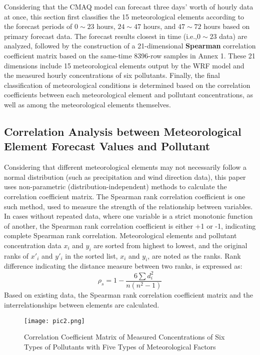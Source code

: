 \documentclass[12pt]{article}
\begin{document}
Considering that the CMAQ model can forecast three days' worth of hourly data at once, this section first classifies the 15 meteorological elements according to the forecast periods of $0\sim23$ hours, $24\sim47$ hours, and $47\sim72$ hours based on primary forecast data. The forecast results closest in time (i.e.,$0\sim23$ data) are analyzed, followed by the construction of a 21-dimensional \textbf{Spearman} correlation coefficient matrix based on the same-time 8396-row samples in Annex 1. These 21 dimensions include 15 meteorological elements output by the WRF model and the measured hourly concentrations of six pollutants. Finally, the final classification of meteorological conditions is determined based on the correlation coefficients between each meteorological element and pollutant concentrations, as well as among the meteorological elements themselves.

\subsection{Correlation Analysis between Meteorological Element Forecast Values and Pollutant }
Considering that different meteorological elements may not necessarily follow a normal distribution (such as precipitation and wind direction data), this paper uses non-parametric (distribution-independent) methods to calculate the correlation coefficient matrix. The Spearman rank correlation coefficient is one such method, used to measure the strength of the relationship between variables. In cases without repeated data, where one variable is a strict monotonic function of another, the Spearman rank correlation coefficient is either +1 or -1, indicating complete Spearman rank correlation.
Meteorological elements and pollutant concentration data $x_i$ and $y_i$ are sorted from highest to lowest, and the original ranks of $x'_i$ and $y'_i$ in the sorted list, $x_i$ and $y_i$, are noted as the ranks. Rank difference indicating the distance measure between two ranks, is expressed as:
\begin{equation}
	\rho_s=1-\frac{6 \sum d_i^2}{n\left(n^2-1\right)}
\end{equation}
Based on existing data, the Spearman rank correlation coefficient matrix and the interrelationships between elements are calculated.
\begin{figure}[H]
	\caption{Correlation Coefficient Matrix of Measured Concentrations of Six Types of Pollutants with Five Types of Meteorological Factors}
	\label{pic2}
	\centering
	\texttt{[image: pic2.png]}
\end{figure}
\end{document}
